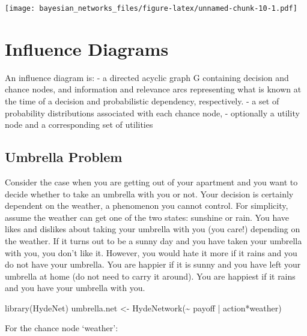 \documentclass[
]{article}
\newenvironment{Shaded}{\begin{snugshade}}{\end{snugshade}}
\newcommand{\FunctionTok}[1]{\textcolor[rgb]{0.00,0.00,0.00}{#1}}
\newcommand{\NormalTok}[1]{#1}
\newcommand{\OtherTok}[1]{\textcolor[rgb]{0.56,0.35,0.01}{#1}}
\newcommand{\SpecialCharTok}[1]{\textcolor[rgb]{0.00,0.00,0.00}{#1}}
\begin{document}
\texttt{[image: bayesian\_networks\_files/figure-latex/unnamed-chunk-10-1.pdf]}

\hypertarget{influence-diagrams}{%
\section{Influence Diagrams}\label{influence-diagrams}}

An influence diagram is:
- a directed acyclic graph G containing decision and chance nodes, and information and relevance arcs representing what is known at the time of a decision and probabilistic dependency, respectively.
- a set of probability distributions associated with each chance node,
- optionally a utility node and a corresponding set of utilities

\hypertarget{umbrella-problem}{%
\subsection{Umbrella Problem}\label{umbrella-problem}}

Consider the case when you are getting out of your apartment and you want to decide whether to take an umbrella with you or not. Your decision is certainly dependent on the weather, a phenomenon you cannot control. For simplicity, assume the weather can get one of the two states: sunshine or rain. You have likes and dislikes about taking your umbrella with you (you care!) depending on the weather. If it turns out to be a sunny day and you have taken your umbrella with you, you don't like it. However, you would hate it more if it rains and you do not have your umbrella. You are happier if it is sunny and you have left your umbrella at home (do not need to carry it around). You are happiest if it rains and you have your umbrella with you.

\begin{Shaded}
\begin{Highlighting}[]
\FunctionTok{library}\NormalTok{(HydeNet)}
\NormalTok{umbrella.net }\OtherTok{\textless{}{-}} \FunctionTok{HydeNetwork}\NormalTok{(}\SpecialCharTok{\textasciitilde{}}\NormalTok{ payoff }\SpecialCharTok{|}\NormalTok{ action}\SpecialCharTok{*}\NormalTok{weather)}
\end{Highlighting}
\end{Shaded}

For the chance node `weather':
\end{document}
